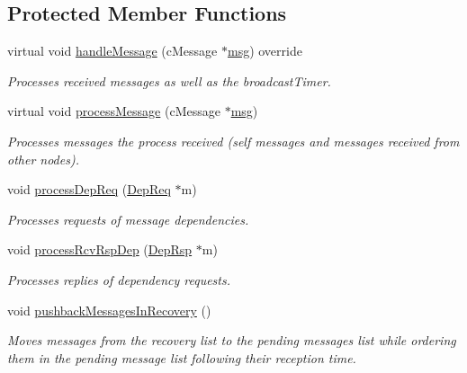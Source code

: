 \subsection*{Protected Member Functions}
\begin{DoxyCompactItemize}
\item 
virtual void \hyperlink{class_node_with_recovery_a901c89606b84898e13fe8a66228acd9f}{handle\+Message} (c\+Message $\ast$\hyperlink{_controller_8h_afa0f3b802fbc219228f7bb97996fa558}{msg}) override
\begin{DoxyCompactList}\small\item\em Processes received messages as well as the broadcast\+Timer. \end{DoxyCompactList}\item 
virtual void \hyperlink{class_node_with_recovery_a216c29d76ddb0e94cd5701ff208c7f5b}{process\+Message} (c\+Message $\ast$\hyperlink{_controller_8h_afa0f3b802fbc219228f7bb97996fa558}{msg})
\begin{DoxyCompactList}\small\item\em Processes messages the process received (self messages and messages received from other nodes). \end{DoxyCompactList}\item 
void \hyperlink{class_node_with_recovery_a52ef51093d41e9b337987810311a7bc6}{process\+Dep\+Req} (\hyperlink{class_dep_req}{Dep\+Req} $\ast$m)
\begin{DoxyCompactList}\small\item\em Processes requests of message dependencies. \end{DoxyCompactList}\item 
void \hyperlink{class_node_with_recovery_a34b5b66f90d85dd84b237b8cf81f2f7e}{process\+Rcv\+Rsp\+Dep} (\hyperlink{class_dep_rsp}{Dep\+Rsp} $\ast$m)
\begin{DoxyCompactList}\small\item\em Processes replies of dependency requests. \end{DoxyCompactList}\item 
void \hyperlink{class_node_with_recovery_a261e41c94a93113168f8f81411b7c100}{pushback\+Messages\+In\+Recovery} ()
\begin{DoxyCompactList}\small\item\em Moves messages from the recovery list to the pending messages list while ordering them in the pending message list following their reception time. \end{DoxyCompactList}\item 

\end{DoxyCompactItemize}

